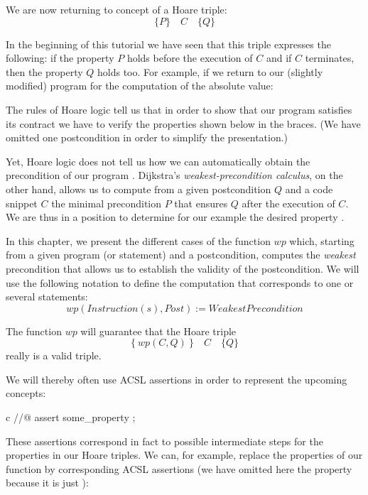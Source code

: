 

We are now returning to concept of a Hoare triple:
$$\{ P \}\quad  C\quad \{ Q \}$$


In the beginning of this tutorial we have seen that this triple
expresses the following: if the property $P$ holds before the
execution of $C$ and if $C$ terminates, then the property $Q$
holds too. For example, if we return to our (slightly modified)
program for the computation of the absolute value:






The rules of Hoare logic tell us that in order to show that our program
satisfies its contract we have to verify the properties shown below in the
braces. (We have omitted one postcondition in order to simplify the
presentation.)






Yet, Hoare logic does not tell us how we can automatically obtain the
precondition  of our program . Dijkstra's
\emph{weakest-precondition calculus}, on the other hand, allows us to
compute from a given postcondition $Q$ and a code snippet $C$ the
minimal precondition $P$ that ensures $Q$ after the execution of
$C$. We are thus in a position to determine for our example
 the desired property .




In this chapter, we present the different cases of the function $wp$
which, starting from a given program (or statement) and a postcondition,
computes the \emph{weakest} precondition that allows us to establish the
validity of the postcondition. We will use the following notation to
define the computation that corresponds to one or several statements:
$$wp(Instruction(s), Post) := WeakestPrecondition$$



The function \(wp\) will guarantee that the Hoare triple
$$\{\ wp(C,Q)\ \}\quad C\quad \{ Q \}$$
really is a valid triple.



We will thereby often use ACSL assertions in order to represent the
upcoming concepts:



\begin{CodeBlock}{c}
//@ assert some_property ;
\end{CodeBlock}



These assertions correspond in fact to possible intermediate steps for
the properties in our Hoare triples. We can, for example, replace the
properties of our function  by corresponding ACSL assertions
(we have omitted here the property  because it is just
):




